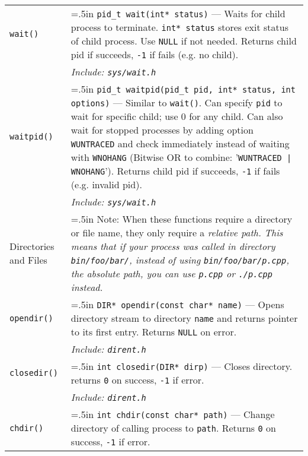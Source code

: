 \documentclass{article}
\newcommand{\indenth}[1][.5]{\hangindent=#1in
                         \hangafter=1 }
\begin{document}
\begin{longtabu}{|p{.9in}|p{6.3in}<{\strut}|}
    \texttt{wait()} & \indenth\texttt{pid\_t wait(int* status)} --- Waits for child process to terminate. \texttt{int* status} stores exit status of child process. Use \texttt{NULL} if not needed. Returns child pid if succeeds, \texttt{-1} if fails (e.g. no child). 
        \\
    & \hspace{.5in}\it Include: \rm\texttt{sys/wait.h}
        \\
    \texttt{waitpid()} & \indenth\texttt{pid\_t waitpid(pid\_t pid, int* status, int options)} --- Similar to \texttt{wait()}. Can specify \texttt{pid} to wait for specific child; use 0 for any child. Can also wait for stopped processes by adding option \texttt{WUNTRACED} and check immediately instead of waiting with \texttt{WNOHANG} (Bitwise OR to combine: '\texttt{WUNTRACED | WNOHANG}'). Returns child pid if succeeds, \texttt{-1} if fails (e.g. invalid pid).
        \\
    & \hspace{.5in}\it Include: \rm\texttt{sys/wait.h}
        \\ \hline
    Directories and Files & \indenth Note: When these functions require a directory or file name, they only require a \itshape relative path\rm. This means that if your process was called in directory \texttt{bin/foo/bar/}, instead of using \texttt{bin/foo/bar/p.cpp}, the \itshape absolute path\rm,  you can use \texttt{p.cpp} or \texttt{./p.cpp} instead. \par
        \\ %
    \texttt{opendir()} & \indenth\texttt{DIR* opendir(const char* name)} --- Opens directory stream to directory \texttt{name} and returns pointer to its first entry. Returns \texttt{NULL} on error. 
        \\
    & \hspace{.5in}\it Include: \rm\texttt{dirent.h}
        \\
    \texttt{closedir()} & \indenth\texttt{int closedir(DIR* dirp)} --- Closes  directory. returns \texttt{0} on success, \texttt{-1} if error.
        \\
    & \hspace{.5in}\it Include: \rm\texttt{dirent.h}
        \\ 
    \texttt{chdir()} & \indenth\texttt{int chdir(const char* path)} --- Change directory of calling process to \texttt{path}. Returns \texttt{0} on success, \texttt{-1} if error.
        \\

\end{longtabu}
\end{document}
